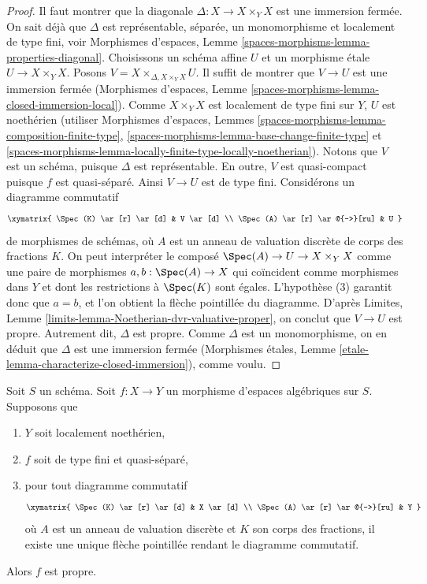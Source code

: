 \begin{proof}
Il faut montrer que la diagonale $\Delta : X \to X \times_Y X$ est une immersion
fermée. On sait déjà que $\Delta$ est représentable, séparée,
un monomorphisme et localement de type fini, voir Morphismes d'espaces, Lemme
\ref{spaces-morphisms-lemma-properties-diagonal}.
Choisissons un schéma affine $U$ et un morphisme \'etale
$U \to X \times_Y X$. Posons $V = X \times_{\Delta, X \times_Y X} U$.
Il suffit de montrer que $V \to U$ est une immersion fermée
(Morphismes d'espaces, Lemme
\ref{spaces-morphisms-lemma-closed-immersion-local}).
Comme $X \times_Y X$ est localement de type fini sur $Y$,
$U$ est noethérien (utiliser Morphismes d'espaces, Lemmes
\ref{spaces-morphisms-lemma-composition-finite-type},
\ref{spaces-morphisms-lemma-base-change-finite-type} et
\ref{spaces-morphisms-lemma-locally-finite-type-locally-noetherian}).
Notons que $V$ est un schéma, puisque $\Delta$ est représentable.
En outre, $V$ est quasi-compact puisque $f$ est quasi-séparé.
Ainsi $V \to U$ est de type fini. Considérons un diagramme commutatif
$$
\xymatrix{
\Spec(K) \ar[r] \ar[d] & V \ar[d] \\
\Spec(A) \ar[r] \ar@{-->}[ru] & U
}
$$
de morphismes de schémas,
où $A$ est un anneau de valuation discrète de corps des fractions $K$.
On peut interpréter le composé $\Spec(A) \to U \to X \times_Y X$
comme une paire de morphismes $a, b : \Spec(A) \to X$ qui coïncident comme morphismes
dans $Y$ et dont les restrictions à $\Spec(K)$ sont égales. L'hypothèse
(3) garantit donc que $a = b$, et l'on obtient la flèche pointillée du diagramme.
D'après Limites, Lemme \ref{limits-lemma-Noetherian-dvr-valuative-proper},
on conclut que $V \to U$ est propre. Autrement dit, $\Delta$ est propre.
Comme $\Delta$ est un monomorphisme, on en déduit que $\Delta$ est une
immersion fermée (Morphismes \'etales, Lemme
\ref{etale-lemma-characterize-closed-immersion}), comme voulu.
\end{proof}

\begin{lemma}
\label{lemma-check-proper-dvr}
Soit $S$ un schéma. Soit $f : X \to Y$ un morphisme d'espaces algébriques
sur $S$. Supposons que
\begin{enumerate}
\item $Y$ soit localement noethérien,
\item $f$ soit de type fini et quasi-séparé,
\item pour tout diagramme commutatif
$$
\xymatrix{
\Spec(K) \ar[r] \ar[d] & X \ar[d] \\
\Spec(A) \ar[r] \ar@{-->}[ru] & Y
}
$$
où $A$ est un anneau de valuation discrète et $K$ son corps des fractions,
il existe une unique flèche pointillée rendant le diagramme commutatif.
\end{enumerate}
Alors $f$ est propre.
\end{lemma}


